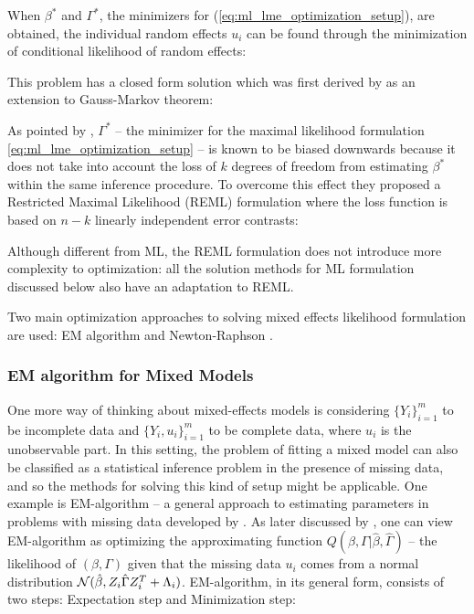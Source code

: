 \documentclass[11pt,letterpaper]{article}
\numberwithin{equation}{section} %
\numberwithin{figure}{section} %
\numberwithin{table}{section} %
\begin{document}
When $\beta^*$ and $\Gamma^*$, the minimizers for (\ref{eq:ml_lme_optimization_setup}), are obtained, the individual random effects $u_i$ can be found through the minimization of conditional likelihood of random effects:


This problem has a closed form solution which was first derived by \cite{Harville1976} as an extension to Gauss-Markov theorem: 


As pointed by \cite{Harville1974}, $\Gamma^*$ -- the minimizer for the maximal likelihood formulation \ref{eq:ml_lme_optimization_setup} -- is known to be biased downwards because it does not take into account the loss of $k$ degrees of freedom from estimating $\beta^*$ within the same inference procedure. To overcome this effect they proposed a Restricted Maximal Likelihood (REML) formulation where the loss function is based on $n-k$ linearly independent error contrasts:


Although different from ML, the REML formulation does not introduce more complexity to optimization: all the solution methods for ML formulation discussed below also have an adaptation to REML.
 
Two main optimization approaches to solving mixed effects likelihood formulation are used: EM algorithm \cite{Dempster1977} and Newton-Raphson \cite{Lindstrom1988}.

\subsubsection{EM algorithm for Mixed Models}
One more way of thinking about mixed-effects models is considering \textbf{$\{Y_i\}_{i=1}^m$} to be incomplete data and \textbf{$\{Y_i, u_i\}_{i=1}^m$} to be complete data, where $u_i$ is the unobservable part. In this setting, the problem of fitting a mixed model can also be classified as a statistical inference problem in the presence of missing data, and so the methods for solving this kind of setup might be applicable. One example is EM-algorithm -- a general approach to estimating parameters in problems with missing data developed by \cite{Dempster1977}. As later discussed by \cite{Laird1982}, one can view EM-algorithm as optimizing the approximating function $Q(\beta, \Gamma | \hat{\beta}, \hat{\Gamma})$ -- the likelihood of $(\beta, \Gamma)$ given that the missing data $u_i$ comes from a normal distribution $\operatorname{\mathcal{N}}(\hat{\beta}, Z_i\hat{\Gamma} Z_i^T + \Lambda_i)$. EM-algorithm, in its general form, consists of two steps: Expectation step and Minimization step: 
\end{document}
